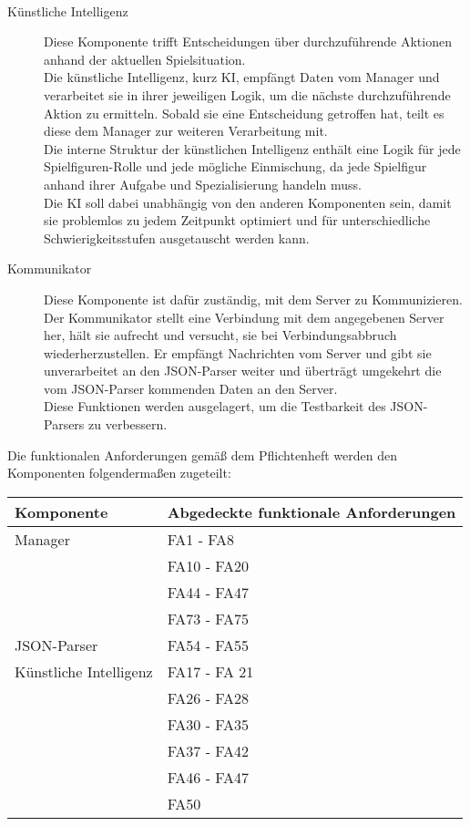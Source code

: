 \begin{description}
	\\
	\item[Künstliche Intelligenz] 
	Diese Komponente trifft Entscheidungen über durchzuführende Aktionen anhand der aktuellen Spielsituation.\\
	Die künstliche Intelligenz, kurz KI, empfängt Daten vom Manager und verarbeitet sie in ihrer jeweiligen Logik, um die nächste durchzuführende Aktion zu ermitteln. Sobald sie eine Entscheidung getroffen hat, teilt es diese dem Manager zur weiteren Verarbeitung mit.\\
	Die interne Struktur der künstlichen Intelligenz enthält eine Logik für jede Spielfiguren-Rolle und jede mögliche Einmischung, da jede Spielfigur anhand ihrer Aufgabe und Spezialisierung handeln muss.\\
	Die KI soll dabei unabhängig von den anderen Komponenten sein, damit sie problemlos zu jedem Zeitpunkt optimiert und für unterschiedliche Schwierigkeitsstufen ausgetauscht werden kann.
	\\
	\item[Kommunikator]
	Diese Komponente ist dafür zuständig, mit dem Server zu Kommunizieren.\\
	Der Kommunikator stellt eine Verbindung mit dem angegebenen Server her, hält sie aufrecht und versucht, sie bei Verbindungsabbruch wiederherzustellen. Er empfängt Nachrichten vom Server und gibt sie unverarbeitet an den JSON-Parser weiter und überträgt umgekehrt die vom JSON-Parser kommenden Daten an den Server.\\
	Diese Funktionen werden ausgelagert, um die Testbarkeit des JSON-Parsers zu verbessern.
\end{description}

Die funktionalen Anforderungen gemäß dem Pflichtenheft werden den Komponenten folgendermaßen zugeteilt:

\begin{tabular}{|l|l|}
	\hline
	\textbf{Komponente} & \textbf{Abgedeckte funktionale Anforderungen}\\\hline
	Manager & FA1 - FA8\\
	& FA10 - FA20\\
	& FA44 - FA47\\
	& FA73 - FA75\\\hline
	JSON-Parser & FA54 - FA55\\\hline
	Künstliche Intelligenz & FA17 - FA 21\\
	& FA26 - FA28\\
	& FA30 - FA35\\
	& FA37 - FA42\\
	&FA46 - FA47\\
	&FA50\\\hline
	
\end{tabular}
